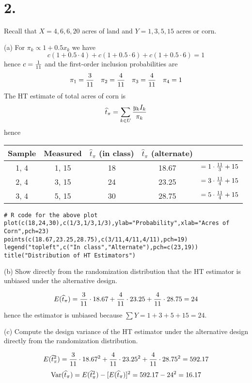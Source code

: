 \documentclass[12pt]{article}
\begin{document}

\section*{2.}
Recall that $X=4,6,6,20$ acres of land and $Y=1,3,5,15$ acres or corn.

(a) For $\pi_k\propto 1+0.5x_k$ we have
\[
c(1+0.5\cdot4)+c(1+0.5\cdot6)+c(1+0.5\cdot6)=1
\]
hence $c={1\over11}$ and the first-order inclusion probabilities
are
\[
\pi_1={3\over11}\quad\pi_2={4\over11}\quad\pi_3={4\over11}
\quad\pi_4=1
\]
The HT estimate of total acres of corn is
\[
\widehat t_\pi=\sum_{k\in U}{y_kI_k\over\pi_k}
\]
hence

\begin{center}
\begin{tabular}{ccccc}
Sample & Measured & $\widehat t_\pi$ (in class) & $\widehat t_\pi$ (alternate)\\
\hline
1, 4 & 1, 15 & 18 & 18.67 & $=1\cdot{11\over3}+15$\\
2, 4 & 3, 15 & 24 & 23.25 & $=3\cdot{11\over4}+15$\\
3, 4 & 5, 15 & 30 & 28.75 & $=5\cdot{11\over4}+15$
\end{tabular}
\end{center}

\begin{center}
\end{center}

\begin{verbatim}
# R code for the above plot
plot(c(18,24,30),c(1/3,1/3,1/3),ylab="Probability",xlab="Acres of Corn",pch=23)
points(c(18.67,23.25,28.75),c(3/11,4/11,4/11),pch=19)
legend("topleft",c("In class","Alternate"),pch=c(23,19))
title("Distribution of HT Estimators")
\end{verbatim}

(b) Show directly from the randomization distribution that the HT
estimator is unbiased under the alternative design.

\[
E(\widehat t_\pi)=
{3\over11}\cdot18.67
+{4\over11}\cdot23.25
+{4\over11}\cdot28.75
=24
\]
hence the estimator is unbiased because $\sum Y=1+3+5+15=24$.

(c) Compute the design variance of the HT estimator under the
alternative design directly from the randomization distribution.

\[
E(\widehat t_\pi^2)=
{3\over11}\cdot18.67^2
+{4\over11}\cdot23.25^2
+{4\over11}\cdot28.75^2
=592.17
\]
\[
\mathop{\rm Var}(\widehat t_\pi)
=E(\widehat t_\pi^2)-[E(\widehat t_\pi)]^2
=592.17-24^2=16.17
\]
\end{document}
